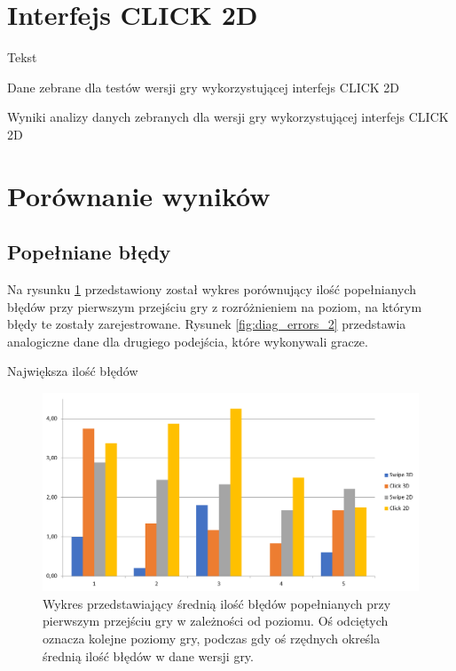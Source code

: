\documentclass[a4paper,12pt,numbers=noenddot]{report}
\begin{document}
\section{Interfejs CLICK 2D}%
Tekst

\begin{table}
  \caption{Dane zebrane dla testów wersji gry wykorzystującej interfejs CLICK 2D}
  \resizebox{\textwidth}{!}{%
	
  }
  \label{tab:results_CLICK2d}%
  \caption{Wyniki analizy danych zebranych dla wersji gry wykorzystującej interfejs CLICK 2D}
  \resizebox{\textwidth}{!}{%
	
  }
  \label{tab:analysis_CLICK2d}%
\end{table}%

\section{Porównanie wyników}

\subsection{Popełniane błędy}
Na rysunku \ref{fig:diag_errors_1} przedstawiony został wykres porównujący ilość popełnianych błędów przy pierwszym przejściu gry z rozróżnieniem na poziom, na którym błędy te zostały zarejestrowane. Rysunek \ref{fig:diag_errors_2} przedstawia analogiczne dane dla drugiego podejścia, które wykonywali gracze.

Największa ilość błędów 


\begin{figure}[h!]
	\centering
  	\includegraphics[width=\linewidth]{diag/errors_1.png}
	\caption{Wykres przedstawiający średnią ilość błędów popełnianych przy pierwszym przejściu gry w zależności od poziomu. Oś odciętych oznacza kolejne poziomy gry, podczas gdy oś rzędnych określa średnią ilość błędów w dane wersji gry.}
	\label{fig:diag_errors_1}
\end{figure}
\end{document}
